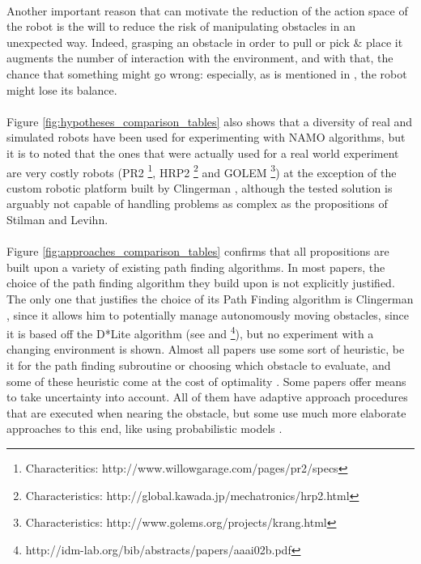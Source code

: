 \paragraph{} Another important reason that can motivate the reduction of the action space of the robot is the will to reduce the risk of manipulating obstacles in an unexpected way. Indeed, grasping an obstacle in order to pull or pick \& place it augments the number of interaction with the environment, and with that, the chance that something might go wrong: especially, as is mentioned in \parencite{stilman_planning_2007}, the robot might lose its balance.

\paragraph{} Figure \ref{fig:hypotheses_comparison_tables} also shows that a diversity of real and simulated robots have been used for experimenting with NAMO algorithms, but it is to noted that the ones that were actually used for a real world experiment are very costly robots (PR2 \footnote{Characteritics: http://www.willowgarage.com/pages/pr2/specs}, HRP2 \footnote{Characteristics: http://global.kawada.jp/mechatronics/hrp2.html} and GOLEM \footnote{Characteristics: http://www.golems.org/projects/krang.html}) at the exception of the custom robotic platform built by Clingerman \parencite{clingerman_estimating_2014}, although the tested solution is arguably not capable of handling problems as complex as the propositions of Stilman and Levihn.

\paragraph{} Figure \ref{fig:approaches_comparison_tables} confirms that all propositions are built upon a variety of existing path finding algorithms. In most papers, the choice of the path finding algorithm they build upon is not explicitly justified. The only one that justifies the choice of its Path Finding algorithm is Clingerman \parencite{clingerman_dynamic_2015}, since it allows him to potentially manage autonomously moving obstacles, since it is based off the D*Lite algorithm (see \parencite{koenig_fast_2005} and \footnote{http://idm-lab.org/bib/abstracts/papers/aaai02b.pdf}), but no experiment with a changing environment is shown. Almost all papers use some sort of heuristic, be it for the path finding subroutine or choosing which obstacle to evaluate, and some of these heuristic come at the cost of optimality \parencite{stilman_navigation_2005, wu_navigation_2010}. Some papers \parencite{stilman_planning_2007, levihn_foresight_2013, levihn_planning_2013, clingerman_estimating_2014, clingerman_dynamic_2015, scholz_navigation_2016} offer means to take uncertainty into account. All of them have adaptive approach procedures that are executed when nearing the obstacle, but some use much more elaborate approaches to this end, like using probabilistic models \parencite{levihn_planning_2013, scholz_navigation_2016}.

